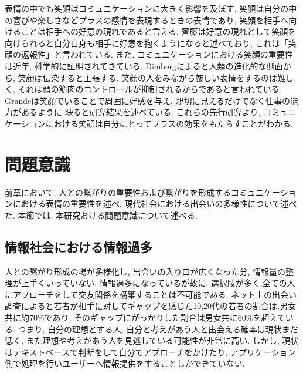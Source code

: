 表情の中でも笑顔はコミュニケーションに大きく影響を及ぼす.
笑顔は自分の中の喜びや楽しさなどプラスの感情を表現するときの表情であり,
笑顔を相手へ向けることは相手への好意の現れであると言える.
齊藤は好意の現れとして笑顔を向けられると自分自身も相手に好意を抱くようになると述べており,
これは「笑顔の返報性」と言われている\cite{齊藤勇2005恋愛心理学}.
また, コミュニケーションにおける笑顔の重要性は近年, 科学的に証明されてきている.
Dimbergによると人類の進化的な側面から, 笑顔は伝染すると主張する.
笑顔の人をみながら厳しい表情をするのは難しく,
それは顔の筋肉のコントロールが抑制されるからであると言われている\cite{dimberg2011voluntary}.
Grandeは笑顔でいることで周囲に好感を与え, 親切に見えるだけでなく仕事の能力があるように
映ると研究結果を述べている\cite{grandey2005service}.
これらの先行研究より, コミュニケーションにおける笑顔は自分にとってプラスの効果をもたらすことがわかる.




\section{問題意識}
前章において, 人との繋がりの重要性および繋がりを形成するコミュニケーションにおける表情の重要性を述べ, 現代社会における出会いの多様性について述べた.
本節では, 本研究おける問題意識について述べる.

\subsection{情報社会における情報過多}
人との繋がり形成の場が多様化し, 出会いの入り口が広くなった分, 情報量の整理が上手くいっていない.
情報過多になっているが故に, 選択肢が多く,全ての人にアプローチをして交友関係を構築することは不可能である.
ネット上の出会い調査によると若者が相手に対してギャップを感じた10,20代の若者の割合は,男女共に約70\%であり,
そのギャップにがっかりした割合は男女共に60\%を超えている\cite{mandom}.
つまり, 自分の理想とする人, 自分と考えがあう人と出会える確率は現状まだ低く,
また理想や考えがあう人を見逃している可能性が非常に高い.
しかし, 現状はテキストベースで判断をして自分でアプローチをかけたり,
アプリケーション側で処理を行いユーザーへ情報提供をすることしかできていない.

